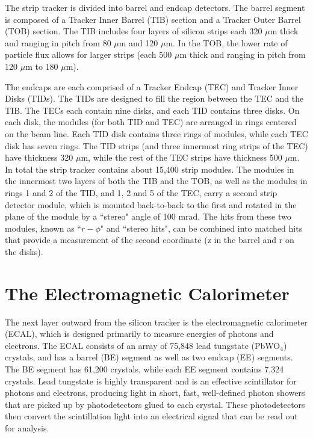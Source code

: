 The strip tracker is divided into barrel and endcap detectors. The barrel segment is composed of a Tracker Inner Barrel (TIB) section and a Tracker Outer Barrel (TOB) section. The TIB includes four layers of silicon strips each 320 $\mu$m thick and ranging in pitch from 80 $\mu$m and 120 $\mu$m. In the TOB, the lower rate of particle flux allows for larger strips (each 500 $\mu$m thick and ranging in pitch from 120 $\mu$m to 180 $\mu$m).

The endcaps are each comprised of a Tracker Endcap (TEC) and Tracker Inner Disks (TIDs). The TIDs are designed to fill the region between the TEC and the TIB. The TECs each contain nine disks, and each TID contains three disks. On each disk, the modules (for both TID and TEC) are arranged in rings centered on the beam line. Each TID disk contains three rings of modules, while each TEC disk has seven rings. The TID strips (and three innermost ring strips of the TEC) have thickness 320 $\mu$m, while the rest of the TEC strips have thickness 500 $\mu$m. In total the strip tracker contains about 15,400 strip modules. The modules in the innermost two layers of both the TIB and the TOB, as well as the modules in rings 1 and 2 of the TID, and 1, 2 and 5 of the TEC, carry a second strip detector module, which
is mounted back-to-back to the first and rotated in the plane of the module by a ``stereo" angle
of 100 mrad. The hits from these two modules, known as ``$r-\phi$" and ``stereo hits", can be combined
into matched hits that provide a measurement of the second coordinate (z in the barrel and r on
the disks).\cite{TrackReco}\cite{TDR}



\section{The Electromagnetic Calorimeter}

The next layer outward from the silicon tracker is the electromagnetic calorimeter (ECAL), which is designed primarily to measure energies of photons and electrons. The ECAL consists of an array of 75,848 lead tungstate (PbWO$_4$) crystals, and has a barrel (BE) segment as well as two endcap (EE) segments. The BE segment has 61,200 crystals, while each EE segment contains 7,324 crystals. Lead tungstate is highly transparent and is an effective scintillator for photons and electrons, producing light in short, fast, well-defined photon showers that are picked up by photodetectors glued to each crystal. These photodetectors then convert the scintillation light into an electrical signal that can be read out for analysis. 

